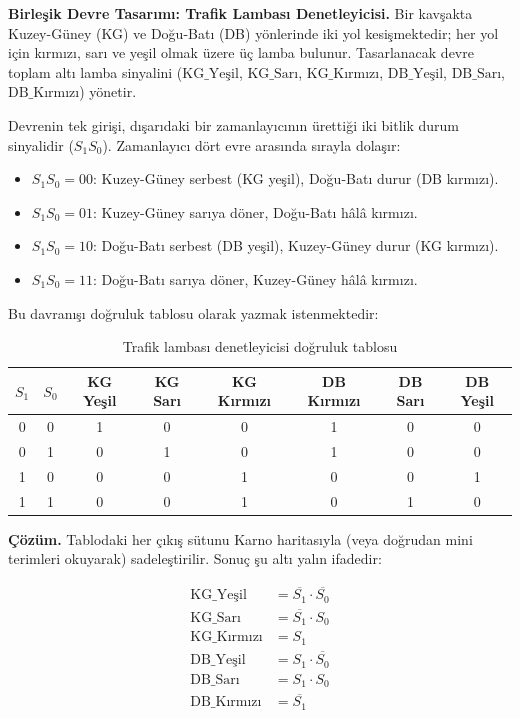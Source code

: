 \begin{ornek}[B.13]
\textbf{Birleşik Devre Tasarımı: Trafik Lambası Denetleyicisi.}
Bir kavşakta Kuzey-Güney (KG) ve Doğu-Batı (DB) yönlerinde iki yol kesişmektedir; her yol için kırmızı, sarı ve yeşil olmak üzere üç lamba bulunur. Tasarlanacak devre toplam altı lamba sinyalini ($\text{KG\_Yeşil}$, $\text{KG\_Sarı}$, $\text{KG\_Kırmızı}$, $\text{DB\_Yeşil}$, $\text{DB\_Sarı}$, $\text{DB\_Kırmızı}$) yönetir.

Devrenin tek girişi, dışarıdaki bir zamanlayıcının ürettiği iki bitlik durum sinyalidir ($S_1 S_0$). Zamanlayıcı dört evre arasında sırayla dolaşır:
\begin{itemize}[nosep]
  \item $S_1 S_0 = 00$: Kuzey-Güney serbest (KG yeşil), Doğu-Batı durur (DB kırmızı).
  \item $S_1 S_0 = 01$: Kuzey-Güney sarıya döner, Doğu-Batı hâlâ kırmızı.
  \item $S_1 S_0 = 10$: Doğu-Batı serbest (DB yeşil), Kuzey-Güney durur (KG kırmızı).
  \item $S_1 S_0 = 11$: Doğu-Batı sarıya döner, Kuzey-Güney hâlâ kırmızı.
\end{itemize}

Bu davranışı doğruluk tablosu olarak yazmak istenmektedir:

\begin{table}[H]
\centering
\caption*{Trafik lambası denetleyicisi doğruluk tablosu}
\label{tab:B.trafik}
\small
\begin{tabular}{cc|ccc|ccc}
\toprule
$S_1$ & $S_0$ & KG Yeşil & KG Sarı & KG Kırmızı & DB Kırmızı & DB Sarı & DB Yeşil \\
\midrule
0 & 0 & 1 & 0 & 0 & 1 & 0 & 0 \\
0 & 1 & 0 & 1 & 0 & 1 & 0 & 0 \\
1 & 0 & 0 & 0 & 1 & 0 & 0 & 1 \\
1 & 1 & 0 & 0 & 1 & 0 & 1 & 0 \\
\bottomrule
\end{tabular}
\end{table}

\textbf{Çözüm.} Tablodaki her çıkış sütunu Karno haritasıyla (veya doğrudan mini terimleri okuyarak) sadeleştirilir. Sonuç şu altı yalın ifadedir:

\[
\begin{aligned}
\text{KG\_Yeşil}    &= \overline{S_1} \cdot \overline{S_0} \\
\text{KG\_Sarı}     &= \overline{S_1} \cdot S_0 \\
\text{KG\_Kırmızı}  &= S_1 \\
\text{DB\_Yeşil}    &= S_1 \cdot \overline{S_0} \\
\text{DB\_Sarı}     &= S_1 \cdot S_0 \\
\text{DB\_Kırmızı}  &= \overline{S_1}
\end{aligned}
\]


\end{ornek}
